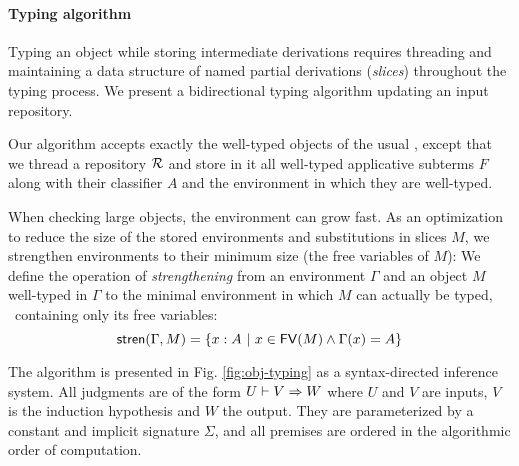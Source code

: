\documentclass{llncs}
\begin{document}
\paragraph{Typing algorithm}

Typing an object while storing intermediate derivations requires
threading and maintaining a data structure of named partial
derivations (\emph{slices}) throughout the typing process. We present
a bidirectional typing algorithm updating an input repository.

Our algorithm accepts exactly the well-typed objects of the usual \LF,
except that we thread a repository $\mathcal{R}$ and store in it all
well-typed applicative subterms $F$ along with their classifier $A$
and the environment in which they are well-typed.



When checking large objects, the environment can grow fast. As an
optimization to reduce the size of the stored environments and
substitutions in slices $M$, we strengthen environments to their
minimum size (the free variables of $M$): We define the operation of
\emph{strengthening} from an environment $\Gamma$ and an object $M$
well-typed in $\Gamma$ to the minimal environment in which $M$ can
actually be typed, \ie\ containing only its free variables:
$$
{\text{\textsf{stren}}}({\Gamma,M}) = \{x : A\ |\ x\in {\text{\textsf{FV}}}({M}) \wedge \Gamma(x)=A\}
$$

The algorithm is presented in Fig. \ref{fig:obj-typing} as a
syntax-directed inference system. All judgments are of the form ${U}\vdash{{V}\Rightarrow{W}}$ where $U$ and $V$ are inputs, $V$ is the induction hypothesis
and $W$ the output. They are parameterized by a constant and implicit
signature $\Sigma$, and all premises are ordered in the algorithmic
order of computation.
\end{document}
